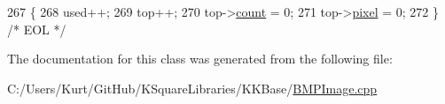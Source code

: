 \begin{DoxyCode}
267 \{
268   used++;
269   top++;
270   top->\hyperlink{struct_bmp_image_1_1_code_pair_a1501fa5638588a3a7afdbbfb62327dae}{count} = 0;
271   top->\hyperlink{struct_bmp_image_1_1_code_pair_ac341a7d727f931dc9c446eb1d67fe022}{pixel} = 0;
272 \}  \textcolor{comment}{/* EOL */}
\end{DoxyCode}


The documentation for this class was generated from the following file\+:\begin{DoxyCompactItemize}
\item 
C\+:/\+Users/\+Kurt/\+Git\+Hub/\+K\+Square\+Libraries/\+K\+K\+Base/\hyperlink{_b_m_p_image_8cpp}{B\+M\+P\+Image.\+cpp}\end{DoxyCompactItemize}
